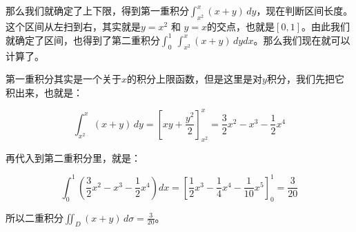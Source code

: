\begin{myexample}
\begin{center}
\end{center}

那么我们就确定了上下限，得到第一重积分$\int_{x^2}^x (x+y) \, dy$，现在判断区间长度。这个区间从左扫到右，其实就是\(y = x^2\) 和 \(y = x\)的交点，也就是$[0,1]$。由此我们就确定了区间，也得到了第二重积分$\int_0^1\ \int_{x^2}^x (x+y) \, dydx$。那么我们现在就可以计算了。

第一重积分其实是一个关于$x$的积分上限函数，但是这里是对$y$积分，我们先把它积出来，也就是：

$$\int_{x^2}^x (x+y) \, dy
= \left[ xy + \frac{y^2}{2} \right]_{x^2}^{x} = \frac{3}{2}x^2 - x^3 - \frac{1}{2}x^4$$

再代入到第二重积分里，就是：

$$\int_0^1 (\frac{3}{2}x^2 - x^3 - \frac{1}{2}x^4) dx=\left[ \frac{1}{2}x^3 - \frac{1}{4}x^4 - \frac{1}{10}x^5 \right]_0^1=\frac{3}{20}$$

所以二重积分$\iint_D (x+y) \, d\sigma=\frac{3}{20}$。
\end{myexample}

